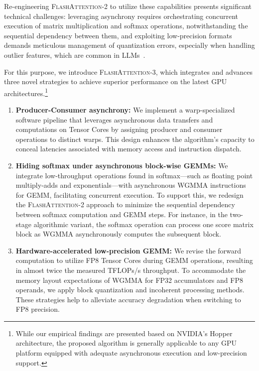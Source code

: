Re-engineering \textsc{FlashAttention-2} to utilize these capabilities presents significant technical challenges: leveraging asynchrony requires orchestrating concurrent execution of matrix multiplication and softmax operations, notwithstanding the sequential dependency between them, and exploiting low-precision formats demands meticulous management of quantization errors, especially when handling outlier features, which are common in LLMs~\citep{dettmers2208llm, sun2024massive}.

For this purpose, we introduce \textsc{FlashAttention-3}, which integrates and advances three novel strategies to achieve superior performance on the latest GPU architectures.\footnote{While our empirical findings are presented based on NVIDIA's Hopper architecture, the proposed algorithm is generally applicable to any GPU platform equipped with adequate asynchronous execution and low-precision support.}

\begin{enumerate}

\item \textbf{Producer-Consumer asynchrony:} We implement a warp-specialized software pipeline that leverages asynchronous data transfers and computations on Tensor Cores by assigning producer and consumer operations to distinct warps. This design enhances the algorithm’s capacity to conceal latencies associated with memory access and instruction dispatch.
\item \textbf{Hiding softmax under asynchronous block-wise GEMMs:} We integrate low-throughput operations found in softmax—such as floating point multiply-adds and exponentials—with asynchronous WGMMA instructions for GEMM, facilitating concurrent execution. To support this, we redesign the \textsc{FlashAttention-2} approach to minimize the sequential dependency between softmax computation and GEMM steps. For instance, in the two-stage algorithmic variant, the softmax operation can process one score matrix block as WGMMA asynchronously computes the subsequent block.
\item \textbf{Hardware-accelerated low-precision GEMM:} We revise the forward computation to utilize FP8 Tensor Cores during GEMM operations, resulting in almost twice the measured TFLOPs/s throughput. To accommodate the memory layout expectations of WGMMA for FP32 accumulators and FP8 operands, we apply block quantization and incoherent processing methods. These strategies help to alleviate accuracy degradation when switching to FP8 precision.
\end{enumerate}

